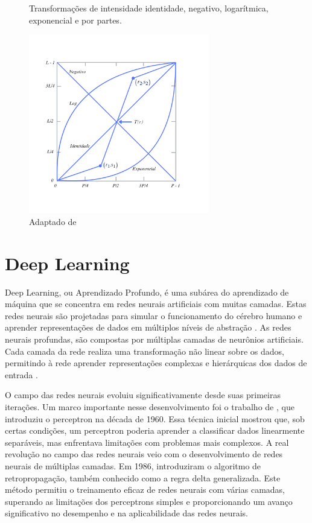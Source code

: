\begin{figure}[h!]
    \centering  
    \caption{Transformações de intensidade identidade, negativo, logarítmica, exponencial e por partes.} 
    \includegraphics[width=0.7\textwidth]{fig/transform3.png}
    \caption*{Adaptado de }
    \label{fig:transform3}
\end{figure}

\newpage

\section{Deep Learning}

Deep Learning, ou Aprendizado Profundo, é uma subárea do aprendizado de máquina que se concentra em redes neurais artificiais com muitas camadas. Estas redes neurais são projetadas para simular o funcionamento do cérebro humano e aprender representações de dados em múltiplos níveis de abstração \cite{goodfellow2016deep}.
As redes neurais profundas, são compostas por múltiplas camadas de neurônios artificiais. Cada camada da rede realiza uma transformação não linear sobre os dados, permitindo à rede aprender representações complexas e hierárquicas dos dados de entrada \cite{haykin2001redes}.


O campo das redes neurais evoluiu significativamente desde suas primeiras iterações. Um marco importante nesse desenvolvimento foi o trabalho de , que introduziu o perceptron na década de 1960. Essa técnica inicial mostrou que, sob certas condições, um perceptron poderia aprender a classificar dados linearmente separáveis, mas enfrentava limitações com problemas mais complexos.
A real revolução no campo das redes neurais veio com o desenvolvimento de redes neurais de múltiplas camadas. Em 1986,  introduziram o algoritmo de retropropagação, também conhecido como a regra delta generalizada. Este método permitiu o treinamento eficaz de redes neurais com várias camadas, superando as limitações dos perceptrons simples e proporcionando um avanço significativo no desempenho e na aplicabilidade das redes neurais.


